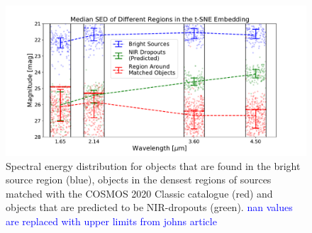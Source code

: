 \begin{figure}[]
    \centering %
    \includegraphics[trim={1cm 0cm 1cm 0cm},clip,width=\textwidth]{Code/Saved_Figures/SED_plot.pdf}
    \caption{Spectral energy distribution for objects that are found in the bright source region (blue), objects in the densest regions of sources matched with the COSMOS 2020 Classic catalogue (red) and objects that are predicted to be NIR-dropouts (green). \textcolor{blue}{nan values are replaced with upper limits from johns article}}
    \label{SED}
\end{figure}
